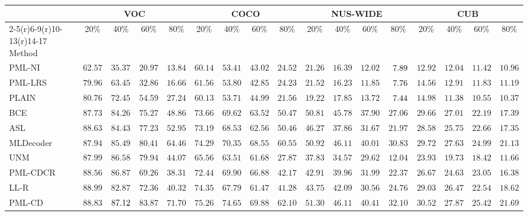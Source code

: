 \documentclass[letterpaper]{article} %
\begin{document}
  \begin{table}[tb]
    \renewcommand{\arraystretch}{1.0}
    \small
    \setlength\tabcolsep{3.6pt}
    \centering
    \begin{tabular}{lcccccccccccccccc}
    \toprule
      & \multicolumn{4}{c}{VOC} & \multicolumn{4}{c}{COCO} & \multicolumn{4}{c}{NUS-WIDE} & \multicolumn{4}{c}{CUB} \\
      \cmidrule(r){2-5}\cmidrule(r){6-9}\cmidrule(r){10-13}\cmidrule(r){14-17}
      Method & 20\% & 40\% & 60\% & 80\% & 20\% & 40\% & 60\% & 80\% & 20\% & 40\% & 60\% & 80\% & 20\% & 40\% & 60\% & 80\% \\
      \midrule
      PML-NI     & $62.57$&$35.37$&$20.97$&$13.84$   & $60.14$&$53.41$&$43.02$&$24.52$ & $21.26$&$16.39$&$12.02$&$\hphantom{0}7.89$  & $12.92$&$12.04$&$11.42$&$10.96$ \\
      PML-LRS    & $79.96$&$63.45$&$32.86$&$16.66$   & $61.56$&$53.80$&$42.85$&$24.23$ & $21.52$&$16.23$&$11.85$&$\hphantom{0}7.76$  & $14.56$&$12.91$&$11.83$&$11.19$ \\
      PLAIN      & $80.76$&$72.45$&$54.59$&$27.24$   & $60.13$&$53.71$&$44.99$&$21.56$ & $19.22$&$17.85$&$13.72$&$\hphantom{0}7.44$  & $14.98$&$11.38$&$10.55$&$10.37$ \\
      \midrule
      BCE        & $87.73$&$84.26$&$75.27$&$48.86$   & $73.66$&$69.62$&$63.52$&$50.47$ & $50.81$&$45.78$&$37.90$&$27.06$  & $29.66$&$27.01$&$22.19$&$17.39$ \\
      ASL        & $88.63$&$84.43$&$77.23$&$52.95$   & $73.19$&$68.53$&$62.56$&$50.46$ & $46.27$&$37.86$&$31.67$&$21.97$  & $28.58$&$25.75$&$22.66$&$17.35$ \\
      MLDecoder  & $87.94$&$85.49$&$80.41$&$64.46$   & $74.29$&$70.35$&$68.55$&$60.55$ & $50.92$&$46.11$&$40.01$&$30.83$  & $29.72$&$27.63$&$24.99$&$21.13$ \\
      \midrule
      UNM        & $87.99$&$86.58$&$79.94$&$44.07$   & $65.56$&$63.51$&$61.68$&$27.87$ & $37.83$&$34.57$&$29.62$&$12.04$  & $23.93$&$19.73$&$18.42$&$11.66$ \\
      PML-CDCR   & $88.56$&$86.87$&$69.26$&$38.31$  & $72.44$&$69.90$&$66.88$&$42.17$ & $42.91$&$39.96$&$31.99$&$22.37$  & $26.67$&$24.63$&$23.05$&$16.38$ \\
      LL-R       &\cellcolor{gray!30}$88.99$&$82.87$&$72.36$&$40.32$   & $74.35$&$67.79$&$61.47$&$41.28$ & $43.75$&$42.09$&$30.56$&$24.76$  & $29.03$&$26.47$&$22.54$&$18.62$ \\
      PML-CD     & $88.83$&$\cellcolor{gray!30}87.12$&\cellcolor{gray!30}$83.87$&\cellcolor{gray!30}$71.70$  & \cellcolor{gray!30}$75.26$&\cellcolor{gray!30}$74.65$&\cellcolor{gray!30}$69.88$&\cellcolor{gray!30}$62.10$ & \cellcolor{gray!30}$51.30$&\cellcolor{gray!30}$46.11$&\cellcolor{gray!30}$40.41$&\cellcolor{gray!30}$32.10$  & \cellcolor{gray!30}$30.52$&\cellcolor{gray!30}$27.87$&\cellcolor{gray!30}$25.42$&\cellcolor{gray!30}$21.69$ \\

\end{tabular}
\end{table}
\end{document}
